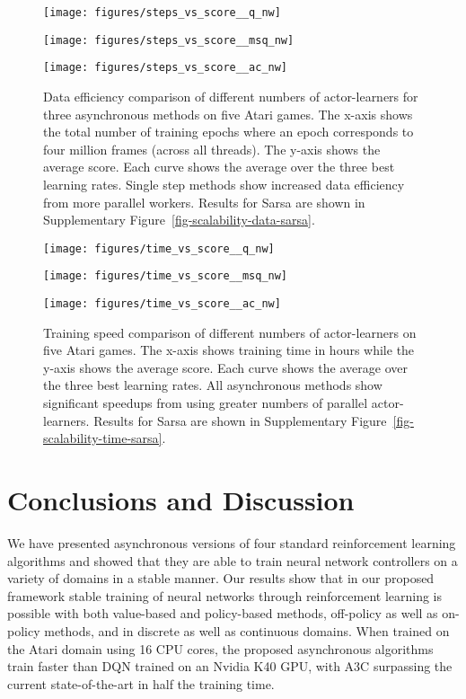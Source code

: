 \documentclass{article} \usepackage{times}
\begin{document}
\begin{figure*}
    \centerline{\texttt{[image: figures/steps\_vs\_score\_\_q\_nw]}}
\centerline{\texttt{[image: figures/steps\_vs\_score\_\_msq\_nw]}}
    \centerline{\texttt{[image: figures/steps\_vs\_score\_\_ac\_nw]}}
    \caption{\label{fig-scalability-data} Data efficiency comparison of different numbers of actor-learners for three asynchronous methods on five Atari games. The x-axis shows the total number of training epochs where an epoch corresponds to four million frames (across all threads).  The y-axis shows the average score. Each curve shows the average over the three best learning rates. Single step methods show increased data efficiency from more parallel workers. Results for Sarsa are shown in Supplementary Figure~\ref{fig-scalability-data-sarsa}.}
\vspace{-0.6cm}
\end{figure*}
\begin{figure*}
    \centerline{\texttt{[image: figures/time\_vs\_score\_\_q\_nw]}}
\centerline{\texttt{[image: figures/time\_vs\_score\_\_msq\_nw]}}
    \centerline{\texttt{[image: figures/time\_vs\_score\_\_ac\_nw]}}
    \caption{\label{fig-scalability-time} Training speed comparison of different numbers of actor-learners on five Atari games. The x-axis shows training time in hours while the y-axis shows the average score.  Each curve shows the average over the three best learning rates. All asynchronous methods show significant speedups from using greater numbers of parallel actor-learners.  Results for Sarsa are shown in Supplementary Figure~\ref{fig-scalability-time-sarsa}.}
\vspace{-0.6cm}
\end{figure*}
 \vspace{-0.1cm}
\section{Conclusions and Discussion}

We have presented asynchronous versions of four standard reinforcement learning algorithms and showed that they are able to train neural network controllers on a variety of domains in a stable manner.
Our results show that in our proposed framework stable training of neural networks through reinforcement learning is possible with both value-based and policy-based methods, off-policy as well as on-policy methods, and in discrete as well as continuous domains.
When trained on the Atari domain using 16 CPU cores, the proposed asynchronous algorithms train faster than DQN trained on an Nvidia K40 GPU, with A3C surpassing the current state-of-the-art in half the training time.
\end{document}
